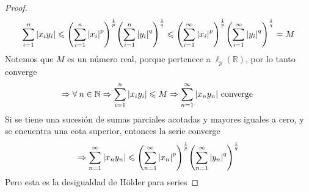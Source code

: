 \documentclass[12pt]{article}
\newcommand\N{\ensuremath{\mathbb{N}}}
\newcommand\R{\ensuremath{\mathbb{R}}}
\begin{document}
\begin{enumerate}[label=\textbf{\arabic*}.]
\begin{proof}
    \begin{equation*}
        \sum_{i=1}^{n} \abs{{x}_{i}{y}_{i}} \leqslant {\left(  \sum_{i=1}^{n} {\abs{{x}_{i}} }^{p} \right)}^{\frac{1}{p}} {\left(  \sum_{i=1}^{n} {\abs{{y}_{i}} }^{q} \right)}^{\frac{1}{q}} \leqslant {\left(  \sum_{i=1}^{\infty} {\abs{{x}_{i}} }^{p} \right)}^{\frac{1}{p}} {\left(  \sum_{i=1}^{\infty} {\abs{{y}_{i}} }^{q} \right)}^{\frac{1}{q}} = M 
    \end{equation*}
    Notemos que $M$ es un número real, porque pertenece a $ {\ell}_{p} (\R)$, por lo tanto converge
    \begin{equation*}
        \Rightarrow \forall \: n \in \N \Rightarrow  \sum_{i=1}^{n} \abs{{x}_{i}{y}_{i}} \leqslant M \Rightarrow \sum_{n=1}^{\infty} \abs{{x}_{n}{y}_{n}} \text{ converge }
    \end{equation*}
    Si se tiene una sucesión de sumas parciales acotadas y mayores iguales a cero, y se encuentra una cota superior, entonces la serie converge
    \begin{equation*}
        \Rightarrow \sum_{n=1}^{\infty} \abs{{x}_{n}{y}_{n}} \leqslant {\left(  \sum_{n=1}^{\infty} {\abs{{x}_{n}} }^{p} \right)}^{\frac{1}{p}} {\left(  \sum_{n=1}^{\infty} {\abs{{y}_{n}} }^{q} \right)}^{\frac{1}{q}}
    \end{equation*}
    Pero esta es la desigualdad de Hölder para series 
\end{proof}
\end{enumerate}
\end{document}
